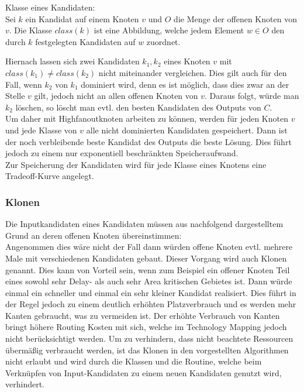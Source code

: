 \documentclass[11pt, a4paper, german]{article}
\newcommand{\TM}{Technology  Mapping }
\begin{document}
\begin{definition}{Klasse eines Kandidaten:}\\
	Sei $k$ ein Kandidat auf einem Knoten $v$ und $O$ die Menge der offenen Knoten von $v$. Die Klasse $class(k)$ ist eine Abbildung, welche jedem Element $w \in O$ den durch $k$ festgelegten Kandidaten auf $w$ zuordnet.
\end{definition}
Hiernach lassen sich zwei Kandidaten $k_1,k_2$ eines Knoten $v$ mit $class(k_1) \neq class(k_2)$ nicht miteinander vergleichen. Dies gilt auch für den Fall, wenn $k_2$ von  $k_1$ dominiert wird, denn es ist möglich, dass dies zwar an der Stelle $v$ gilt, jedoch nicht an allen offenen Knoten von $v$. Daraus folgt, würde man $k_2$ löschen, so löscht man evtl. den besten Kandidaten des Outputs von $C$. \\
Um daher mit Highfanoutknoten arbeiten zu können, werden für jeden Knoten $v$ und jede Klasse von $v$ alle nicht dominierten Kandidaten gespeichert. Dann ist der noch verbleibende beste Kandidat des Outputs die beste Lösung. Dies führt jedoch zu einem nur exponentiell beschränkten Speicheraufwand.\\
Zur Speicherung der Kandidaten wird für jede Klasse eines Knotens eine Tradeoff-Kurve angelegt.

\subsubsection{Klonen}\label{subsubsec:klonen}
Die Inputkandidaten eines Kandidaten müssen aus nachfolgend dargestelltem Grund an deren offenen Knoten übereinstimmen:\\
Angenommen dies wäre nicht der Fall dann würden offene Knoten evtl. mehrere Male mit verschiedenen Kandidaten gebaut. Dieser Vorgang wird auch Klonen genannt. Dies kann von Vorteil sein, wenn zum Beispiel ein offener Knoten Teil eines sowohl sehr Delay- als auch sehr Area kritischen Gebietes ist. Dann würde einmal ein schneller und einmal ein sehr kleiner Kandidat realisiert. Dies führt in der Regel jedoch zu einem deutlich erhöhten Platzverbrauch und es werden mehr Kanten gebraucht, was zu vermeiden ist. Der erhöhte Verbrauch von Kanten bringt höhere Routing Kosten mit sich, welche im \TM jedoch nicht berücksichtigt werden. Um zu verhindern, dass nicht beachtete Ressourcen übermäßig verbraucht werden, ist das Klonen in den vorgestellten Algorithmen nicht erlaubt und wird durch die Klassen und die Routine, welche beim Verknüpfen von Input-Kandidaten zu einem neuen Kandidaten genutzt wird, verhindert. 
\end{document}
